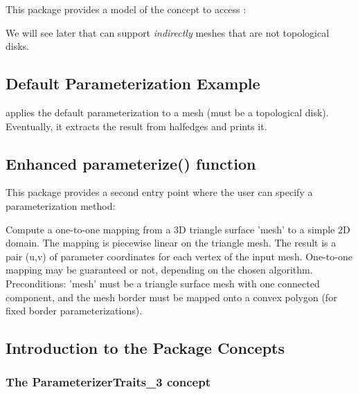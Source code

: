 This package provides a model of the  concept
to access : \\

We will see later that  can support \emph{indirectly}
meshes that are not topological disks.


\subsection{Default Parameterization Example}

 applies the default parameterization to a
 mesh (must be a topological disk).
Eventually, it extracts the result from halfedges and prints it.



\subsection{Enhanced parameterize() function}

This package provides a second  entry point
where the user can specify a parameterization method:

{
Compute a one-to-one mapping from a 3D triangle surface 'mesh' to a simple 2D domain. The mapping is piecewise linear on the triangle mesh. The result is a pair (u,v) of parameter coordinates for each vertex of the input mesh.
One-to-one mapping may be guaranteed or not, depending on the chosen  algorithm.\\
Preconditions: 'mesh' must be a triangle surface mesh with one connected component, and the mesh border must be mapped onto a convex polygon (for fixed border parameterizations).}


\subsection{Introduction to the Package Concepts}

\subsubsection{The ParameterizerTraits\_3 concept}

